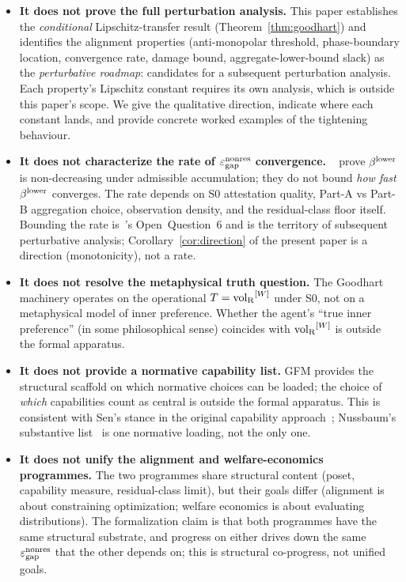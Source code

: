 \begin{itemize}
\item
\textbf{It does not prove the full perturbation analysis.}
This paper establishes the \emph{conditional} Lipschitz-transfer
result (Theorem~\ref{thm:goodhart}) and identifies the
alignment properties (anti-monopolar threshold, phase-boundary
location, convergence rate, damage bound, aggregate-lower-bound
slack) as the \emph{perturbative roadmap}: candidates for a
subsequent perturbation analysis.  Each property's Lipschitz
constant requires its own analysis, which is outside this
paper's scope.  We give the qualitative direction, indicate
where each constant lands, and provide concrete worked examples
of the tightening behaviour.

\item
\textbf{It does not characterize the rate of $\varepsilon_{\mathrm{gap}}^{\mathrm{nonres}}$
convergence.}  ~\citep[Propositions~2~and~3]{lasser2026paper8a}
prove $\beta^{\mathrm{lower}}$ is non-decreasing under admissible accumulation;
they do not bound \emph{how fast} $\beta^{\mathrm{lower}}$ converges.  The rate
depends on S0 attestation quality, Part-A vs Part-B aggregation
choice, observation density, and the residual-class floor itself.
Bounding the rate is~\citep[Need~Sufficiency]{lasser2026paper8b}'s
Open~Question~6 and is the territory of subsequent perturbative
analysis; Corollary~\ref{cor:direction} of the present paper is a
direction (monotonicity), not a rate.

\item
\textbf{It does not resolve the metaphysical truth question.}
The Goodhart machinery operates on the operational
$T = {\operatorname{vol}_{\mathrm{R}}}^{[W]}$ under S0, not on a metaphysical model of inner
preference.  Whether the agent's ``true inner preference'' (in
some philosophical sense) coincides with ${\operatorname{vol}_{\mathrm{R}}}^{[W]}$ is outside
the formal apparatus.

\item
\textbf{It does not provide a normative capability list.}
GFM provides the structural scaffold on which normative choices
can be loaded; the choice of \emph{which} capabilities count as
central is outside the formal apparatus.  This is consistent with
Sen's stance in the original capability
approach~\citep{sen1985commodities};
Nussbaum's substantive list~\citep{nussbaum2000women,nussbaum2011creating}
is one normative loading, not the only one.

\item
\textbf{It does not unify the alignment and welfare-economics
programmes.}  The two programmes share structural content
(poset, capability measure, residual-class limit), but their
goals differ (alignment is about constraining optimization;
welfare economics is about evaluating distributions).  The
formalization claim is that both programmes have the same
structural substrate, and progress on either drives down the
same $\varepsilon_{\mathrm{gap}}^{\mathrm{nonres}}$ that the other depends on; this is structural
co-progress, not unified goals.


\end{itemize}
